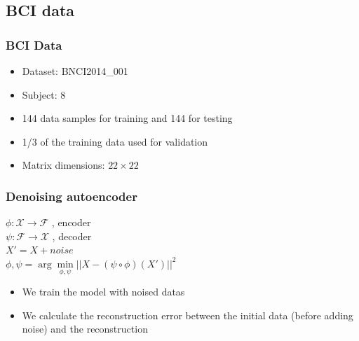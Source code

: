 \documentclass{beamer}
\begin{document}
\subsection{BCI data}

\begin{frame}
    \frametitle{BCI Data}
    \begin{itemize}
        \item Dataset: BNCI2014\_001
        \item Subject: 8
        \item 144 data samples for training and 144 for testing
        \item 1/3 of the training data used for validation
        \item Matrix dimensions: $22 \times 22$
    \end{itemize}
\end{frame}
    

\begin{frame}
    \frametitle{Denoising autoencoder}
    \begin{center}
        $ \phi : \mathcal{X} \rightarrow \mathcal{F}$ , encoder \\
        $ \psi : \mathcal{F} \rightarrow \mathcal{X}$ , decoder \\
        $ X' = X + noise $ \\
        $ \phi,\psi = \arg \min\limits_{\phi,\psi} || X-(\psi \circ \phi)(X')||^2$ \\
    \end{center}
    \begin{itemize}
        \item We train the model with noised datas
        \item We calculate the reconstruction error between the initial data (before adding noise) and the reconstruction
    \end{itemize}

\end{frame}
\end{document}
